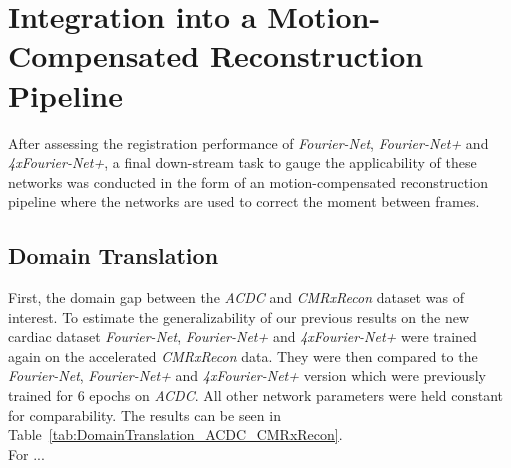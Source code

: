 \section{Integration into a Motion-Compensated Reconstruction Pipeline} \label{Sec:ResultsIntegrationMotion-CompensatedReconstructionPipeline}
After assessing the registration performance of \emph{Fourier-Net}, \emph{Fourier-Net+} and \emph{4xFourier-Net+}, a final down-stream task to gauge the applicability of these networks was conducted in the form of an motion-compensated reconstruction pipeline where the networks are used to correct the moment between frames.

\subsection{Domain Translation} \label{SubSec:ResultsDomainTranslation}
First, the domain gap between the \emph{ACDC} and \emph{CMRxRecon} dataset was of interest. To estimate the generalizability of our previous results on the new cardiac dataset 
\emph{Fourier-Net}, \emph{Fourier-Net+} and \emph{4xFourier-Net+} were trained again on the accelerated \emph{CMRxRecon} data. They were then compared to the \emph{Fourier-Net}, \emph{Fourier-Net+} and \emph{4xFourier-Net+} version which were previously trained for 6 epochs on \emph{ACDC}. All other network parameters were held constant for comparability. The results can be seen in Table~\ref{tab:DomainTranslation_ACDC_CMRxRecon}.\\
For ...

